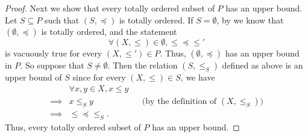 \begin{proof}
  Next we show that every totally ordered subset of \(P\) has an upper bound.
  Let \(S \subseteq P\) such that \((S, \preceq)\) is totally ordered.
  If \(S = \emptyset\), by  we know that \((\emptyset, \preceq)\) is totally ordered, and the statement
  \[
    \forall (X, \leq) \in \emptyset, \leq \preceq \leq'
  \]
  is vacuously true for every \((X, \leq') \in P\).
  Thus, \((\emptyset, \preceq)\) has an upper bound in \(P\).
  So suppose that \(S \neq \emptyset\).
  Then the relation \((S, \leq_S)\) defined as above is an upper bound of \(S\) since for every \((X, \leq) \in S\), we have
  \begin{align*}
             & \forall x, y \in X, x \leq y                                                    \\
    \implies & x \leq_S y                   &  & \text{(by the definition of \((X, \leq_S)\))} \\
    \implies & \leq \preceq \leq_S.
  \end{align*}
  Thus, every totally ordered subset of \(P\) has an upper bound.


\end{proof}
